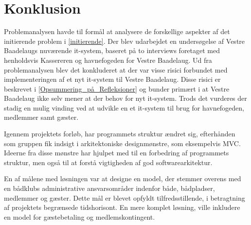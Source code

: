 \chapter{Konklusion}
\label{cha:konklusion}

Problemanalysen havde til formål at analysere de forskellige aspekter af det initierende problem i \cref{initierende}. Der blev udarbejdet en undersøgelse af Vestre Baadelaugs nuværende it-system, baseret på to interviews foretaget med henholdsvis Kassereren og havnefogeden for Vestre Baadelaug. Ud fra problemanalysen blev det konkluderet at der var visse risici forbundet med implementeringen af et nyt it-system til Vestre Baadelaug. Disse risici er beskrevet i \cref{Opsummering_på_Refleksioner} og bunder primært i at Vestre Baadelaug ikke selv mener at der behov for nyt it-system. Trods det vurderes der stadig en mulig vinding ved at udvikle en et it-system til brug for havnefogeden, medlemmer samt gæster.  


Igennem projektets forløb, har programmets struktur ændret sig, efterhånden som gruppen fik indsigt i arkitektoniske designmønstre, som eksempelvis MVC. Ideerne fra disse mønstre har hjulpet med til en forbedring af programmets struktur, men også til at forstå vigtigheden af god softwarearkitektur.


En af målene med løsningen var at designe en model, der stemmer overens med en bådklubs administrative ansvarsområder indenfor både, bådpladser, medlemmer og gæster. Dette mål er blevet opfyldt tilfredsstillende, i betragtning af projektets begrænsede tidshorisont. En mere komplet løsning, ville inkludere en model for gæstebetaling og medlemskontingent.

